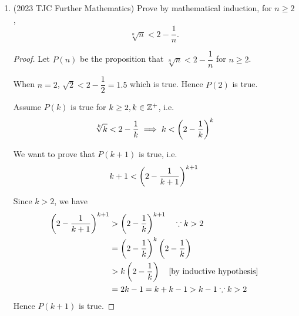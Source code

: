 \documentclass[12pt,a4 paper]{article}
\begin{document}
\begin{enumerate}
\begin{proof}
First we find $\gcd(1591,3913)$ using the Euclidean Algorithm.
\begin{align*}
3913 &= 2\times1591+731 \\
1591 &= 2\times731+129 \\
731 &= 5\times129+86 \\
129 &= 1\times86+43 \\
86 &= 2\times43+0
\end{align*}
Thus $\gcd(1591,3913)=43$. By Bezout's Lemma, there are integer solutions for $1591x+3913y=43$. Since $43\mid9331$, multiplying both sides by some constant, there are also integer solutions for $1591x+3913y=9331$.

To prove by contradiction, we assume that $x$ is prime, and there exists some integer $y$ such that $1591x+3913y=9331$. Dividing both sides by $43$,
\begin{equation*}\tag{$\star$}
37x+91y=217.
\end{equation*}
Observe that $7\mid91y$ and $7\mid217$, so $7\mid37x$.

Since $\gcd(7,37)=1$ so $7\mid x$. By our assumption, $x$ is a prime so $x=7$.

Substituting $x=7$ into ($\star$), we get $y=-\dfrac{6}{13}$, which contradicts $y$ being an integer.

Hence we conclude that $x$ cannot be a prime.
\end{proof}

\item (2023 TJC Further Mathematics) Prove by mathematical induction, for $n\ge2$,
\[ \sqrt[n]{n}<2 - \frac{1}{n}. \]

\begin{proof}
Let $P(n)$ be the proposition that $\sqrt[n]{n}<2 - \dfrac{1}{n}$ for $n \ge 2$.

When $n=2$, $\sqrt{2} <2-\dfrac{1}{2}=1.5$ which is true. Hence $P(2)$ is true.

Assume $P(k)$ is true for $k \ge 2, k \in \mathbb Z^+$, i.e.
\[ \sqrt[k]{k}<2 - \dfrac{1}{k} \implies k<\left(2-\frac{1}{k}\right)^k \]

We want to prove that $P(k+1)$ is true, i.e.
\[ k+1<\left(2-\frac{1}{k+1}\right)^{k+1} \]

Since $k>2$, we have 
\begin{align*}
\left(2-\frac{1}{k+1}\right)^{k+1}
&> \left(2-\frac{1}{k}\right)^{k+1} \quad \because k>2 \\
&= \left(2-\frac{1}{k}\right)^k\left(2-\frac{1}{k}\right) \\
&> k\left(2-\frac{1}{k}\right) \quad \text{[by inductive hypothesis]} \\
&= 2k-1=k+k-1 > k-1 \because k>2
\end{align*}
Hence $P(k+1)$ is true.


\end{proof}
\end{enumerate}
\end{document}
